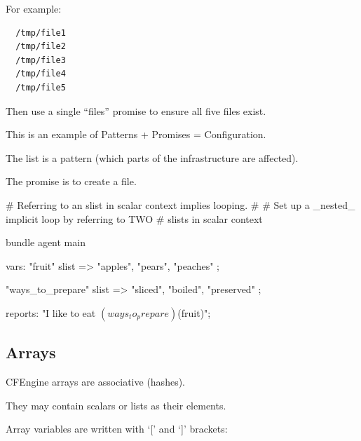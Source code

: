 \begin{aside}
\label{aside:exercise_14}

For example:

\begin{verbatim}
  /tmp/file1
  /tmp/file2
  /tmp/file3
  /tmp/file4
  /tmp/file5
\end{verbatim}

Then use a single ``files'' promise to ensure all five files exist.

This is an example of Patterns + Promises = Configuration.

The list is a pattern (which parts of the infrastructure are affected).

The promise is to create a file.

\end{aside}
\begin{codelisting}
\begin{code}
# Referring to an slist in scalar context implies looping.
#
# Set up a _nested_ implicit loop by referring to TWO
# slists in scalar context

bundle agent main
{
  vars:
      "fruit"
        slist => { "apples", "pears", "peaches" };

      "ways_to_prepare"
        slist => { "sliced", "boiled", "preserved" };

  reports:
      "I like to eat $(ways_to_prepare) $(fruit)";
}
\end{code}
\end{codelisting}





\subsection{Arrays}





CFEngine arrays are associative (hashes).

They may contain scalars or lists as their elements.

Array variables are written with `{[}' and `{]}' brackets:


